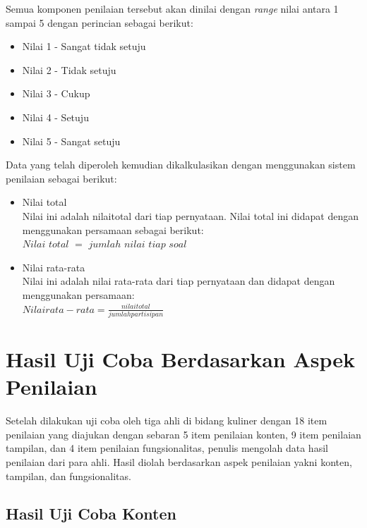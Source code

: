 		Semua komponen penilaian tersebut akan dinilai dengan \textit{range} nilai antara 1 sampai 5 dengan perincian sebagai berikut:
		\begin{itemize}
			\item Nilai 1 - Sangat tidak setuju
			\item Nilai 2 - Tidak setuju
			\item Nilai 3 - Cukup
			\item Nilai 4 - Setuju
			\item Nilai 5 - Sangat setuju
		\end{itemize}
		\vspace{5cm}
		Data yang telah diperoleh kemudian dikalkulasikan dengan menggunakan sistem penilaian sebagai berikut:
		\begin{itemize}
			\item Nilai total\\
			Nilai ini adalah nilaitotal dari tiap pernyataan. Nilai total ini didapat dengan menggunakan persamaan sebagai berikut:\\
			$Nilai$ $total$ $=$ $jumlah$ $nilai$ $tiap$ $soal$
			\item Nilai rata-rata\\
			Nilai ini adalah nilai rata-rata dari tiap pernyataan dan didapat dengan menggunakan persamaan:\\
			$Nilai  rata-rata = \frac{nilai total}{jumlah partisipan}$
		\end{itemize}
	
	\section{Hasil Uji Coba Berdasarkan Aspek Penilaian}		
		Setelah dilakukan uji coba oleh tiga ahli di bidang kuliner dengan 18 item penilaian yang diajukan dengan sebaran 5 item penilaian konten, 9 item penilaian tampilan, dan 4 item penilaian fungsionalitas, penulis mengolah data hasil penilaian dari para ahli. Hasil diolah berdasarkan aspek penilaian yakni konten, tampilan, dan fungsionalitas.
		
		\subsection{Hasil Uji Coba Konten}
		
